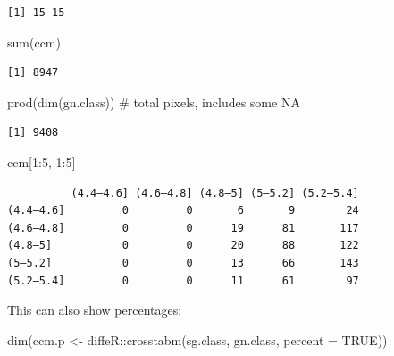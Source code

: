 \documentclass[
  letterpaper,
  DIV=11,
  numbers=noendperiod]{scrartcl}
\newenvironment{Shaded}{\begin{snugshade}}{\end{snugshade}}
\newcommand{\AttributeTok}[1]{\textcolor[rgb]{0.40,0.45,0.13}{#1}}
\newcommand{\CommentTok}[1]{\textcolor[rgb]{0.37,0.37,0.37}{#1}}
\newcommand{\ConstantTok}[1]{\textcolor[rgb]{0.56,0.35,0.01}{#1}}
\newcommand{\DecValTok}[1]{\textcolor[rgb]{0.68,0.00,0.00}{#1}}
\newcommand{\FunctionTok}[1]{\textcolor[rgb]{0.28,0.35,0.67}{#1}}
\newcommand{\NormalTok}[1]{\textcolor[rgb]{0.00,0.23,0.31}{#1}}
\newcommand{\OtherTok}[1]{\textcolor[rgb]{0.00,0.23,0.31}{#1}}
\newcommand{\SpecialCharTok}[1]{\textcolor[rgb]{0.37,0.37,0.37}{#1}}
\begin{document}
\begin{verbatim}
[1] 15 15
\end{verbatim}

\begin{Shaded}
\begin{Highlighting}[]
\FunctionTok{sum}\NormalTok{(ccm)}
\end{Highlighting}
\end{Shaded}

\begin{verbatim}
[1] 8947
\end{verbatim}

\begin{Shaded}
\begin{Highlighting}[]
\FunctionTok{prod}\NormalTok{(}\FunctionTok{dim}\NormalTok{(gn.class))  }\CommentTok{\# total pixels, includes some NA}
\end{Highlighting}
\end{Shaded}

\begin{verbatim}
[1] 9408
\end{verbatim}

\begin{Shaded}
\begin{Highlighting}[]
\NormalTok{ccm[}\DecValTok{1}\SpecialCharTok{:}\DecValTok{5}\NormalTok{, }\DecValTok{1}\SpecialCharTok{:}\DecValTok{5}\NormalTok{]}
\end{Highlighting}
\end{Shaded}

\begin{verbatim}
          (4.4–4.6] (4.6–4.8] (4.8–5] (5–5.2] (5.2–5.4]
(4.4–4.6]         0         0       6       9        24
(4.6–4.8]         0         0      19      81       117
(4.8–5]           0         0      20      88       122
(5–5.2]           0         0      13      66       143
(5.2–5.4]         0         0      11      61        97
\end{verbatim}

This can also show percentages:

\begin{Shaded}
\begin{Highlighting}[]
\FunctionTok{dim}\NormalTok{(ccm.p }\OtherTok{\textless{}{-}}\NormalTok{ diffeR}\SpecialCharTok{::}\FunctionTok{crosstabm}\NormalTok{(sg.class, gn.class, }\AttributeTok{percent =} \ConstantTok{TRUE}\NormalTok{))}
\end{Highlighting}
\end{Shaded}
\end{document}
